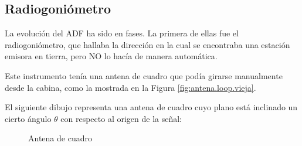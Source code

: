 \subsection{Radiogoni\'ometro}

La evoluci\'on del ADF ha sido en fases. La primera de ellas fue el radiogoni\'ometro, que hallaba la direcci\'on en la cual se encontraba una estaci\'on emisora en tierra, pero NO lo hac\'ia de manera autom\'atica.

Este instrumento ten\'ia una antena de cuadro que pod\'ia girarse manualmente desde la cabina, como la mostrada en la Figura \ref{fig:antena.loop.vieja}.

El siguiente dibujo representa una antena de cuadro cuyo plano est\'a inclinado un cierto \'angulo $\theta$ con respecto al origen de la se\~nal:


\begin{figure}[!h]
  \centering
{}
  \caption{Antena de cuadro}
\end{figure}


